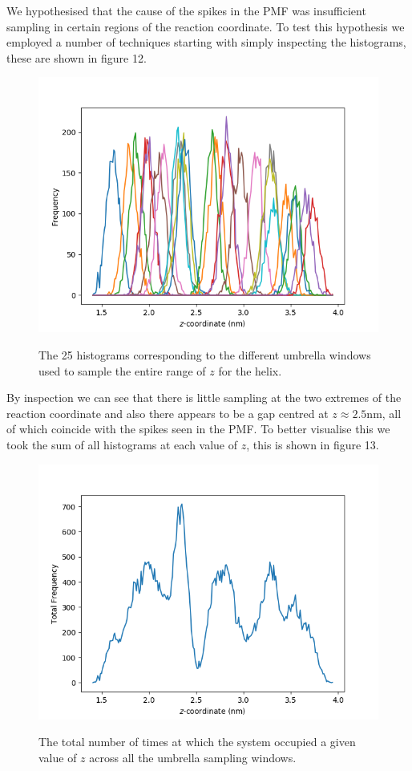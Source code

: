 \documentclass[12pt, onecolumn]{revtex4}    %
\begin{document}
We hypothesised that the cause of the spikes in the PMF was insufficient sampling in certain regions of the reaction coordinate.  To test this hypothesis we employed a number of techniques starting with simply inspecting the histograms, these are shown in figure 12.\\

\begin{figure}[h!]
\includegraphics[scale=0.5]{HelUMBs}
\label{fig: HelUmbHists}
\caption{The 25 histograms corresponding to the different umbrella windows used to sample the entire range of $z$ for the helix.}
\end{figure}

By inspection we can see that there is little sampling at the two extremes of the reaction coordinate and also there appears to be a gap centred at $z \approx 2.5$nm, all of which coincide with the spikes seen in the PMF.  To better visualise this we took the sum of all histograms at each value of $z$, this is shown in figure 13.\\

\begin{figure}[h!]
\includegraphics[scale=0.5]{HelUMBSums}
\label{fig: HelUmbSum}
\caption{The total number of times at which the system occupied a given value of $z$ across all the umbrella sampling windows.}
\end{figure}
\end{document}

